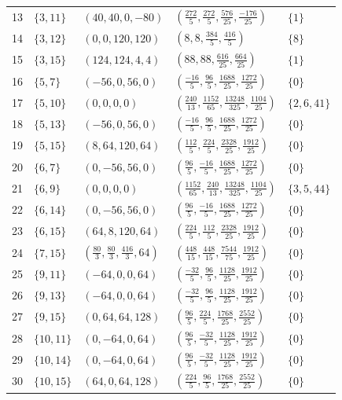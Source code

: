 \documentclass[11pt,a4paper]{article}
\theoremstyle{definition}\newtheorem{definition}[theorem]{Definition}
\theoremstyle{remark}\newtheorem{remark}[theorem]{Remark}
\newcommand{\1}{\mathbf 1}
\begin{document}
\begin{longtable}{@{}r l l l l@{}}
13 & $\{3,11\}$ & $(40,40,0,-80)$ & $(\frac{272}{5},\frac{272}{5},\frac{576}{25},\frac{-176}{25})$ & $\{1\}$\\
14 & $\{3,12\}$ & $(0,0,120,120)$ & $(8,8,\frac{384}{5},\frac{416}{5})$ & $\{8\}$\\
15 & $\{3,15\}$ & $(124,124,4,4)$ & $(88,88,\frac{616}{25},\frac{664}{25})$ & $\{1\}$\\
16 & $\{5,7\}$ & $(-56,0,56,0)$ & $(\frac{-16}{5},\frac{96}{5},\frac{1688}{25},\frac{1272}{25})$ & $\{0\}$\\
17 & $\{5,10\}$ & $(0,0,0,0)$ & $(\frac{240}{13},\frac{1152}{65},\frac{13248}{325},\frac{1104}{25})$ & $\{2,6,41\}$\\
18 & $\{5,13\}$ & $(-56,0,56,0)$ & $(\frac{-16}{5},\frac{96}{5},\frac{1688}{25},\frac{1272}{25})$ & $\{0\}$\\
19 & $\{5,15\}$ & $(8,64,120,64)$ & $(\frac{112}{5},\frac{224}{5},\frac{2328}{25},\frac{1912}{25})$ & $\{0\}$\\
20 & $\{6,7\}$ & $(0,-56,56,0)$ & $(\frac{96}{5},\frac{-16}{5},\frac{1688}{25},\frac{1272}{25})$ & $\{0\}$\\
21 & $\{6,9\}$ & $(0,0,0,0)$ & $(\frac{1152}{65},\frac{240}{13},\frac{13248}{325},\frac{1104}{25})$ & $\{3,5,44\}$\\
22 & $\{6,14\}$ & $(0,-56,56,0)$ & $(\frac{96}{5},\frac{-16}{5},\frac{1688}{25},\frac{1272}{25})$ & $\{0\}$\\
23 & $\{6,15\}$ & $(64,8,120,64)$ & $(\frac{224}{5},\frac{112}{5},\frac{2328}{25},\frac{1912}{25})$ & $\{0\}$\\
24 & $\{7,15\}$ & $(\frac{80}{3},\frac{80}{3},\frac{416}{3},64)$ & $(\frac{448}{15},\frac{448}{15},\frac{7544}{75},\frac{1912}{25})$ & $\{0\}$\\
25 & $\{9,11\}$ & $(-64,0,0,64)$ & $(\frac{-32}{5},\frac{96}{5},\frac{1128}{25},\frac{1912}{25})$ & $\{0\}$\\
26 & $\{9,13\}$ & $(-64,0,0,64)$ & $(\frac{-32}{5},\frac{96}{5},\frac{1128}{25},\frac{1912}{25})$ & $\{0\}$\\
27 & $\{9,15\}$ & $(0,64,64,128)$ & $(\frac{96}{5},\frac{224}{5},\frac{1768}{25},\frac{2552}{25})$ & $\{0\}$\\
28 & $\{10,11\}$ & $(0,-64,0,64)$ & $(\frac{96}{5},\frac{-32}{5},\frac{1128}{25},\frac{1912}{25})$ & $\{0\}$\\
29 & $\{10,14\}$ & $(0,-64,0,64)$ & $(\frac{96}{5},\frac{-32}{5},\frac{1128}{25},\frac{1912}{25})$ & $\{0\}$\\
30 & $\{10,15\}$ & $(64,0,64,128)$ & $(\frac{224}{5},\frac{96}{5},\frac{1768}{25},\frac{2552}{25})$ & $\{0\}$\\

\end{longtable}
\end{document}

